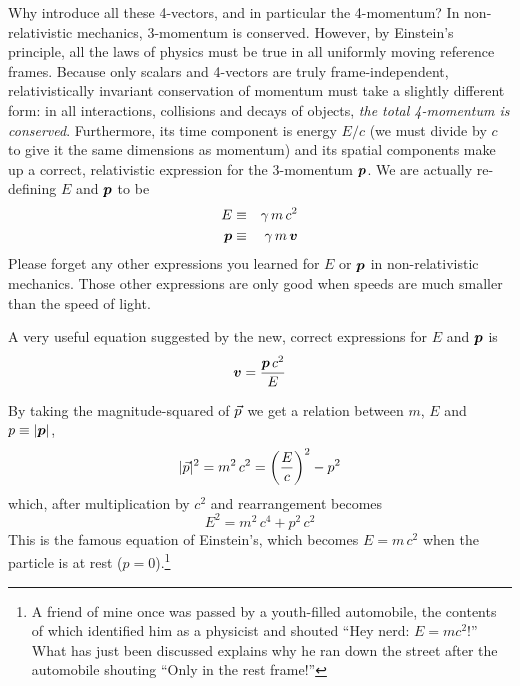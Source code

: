Why introduce all these 4-vectors, and in particular the 4-momentum?
In non-relativistic mechanics, 3-momentum is conserved.  However, by
Einstein's principle, all the laws of physics must be true in all
uniformly moving reference frames.  Because only scalars and 4-vectors
are truly frame-independent, relativistically invariant conservation
of momentum must take a slightly different form: in all interactions,
collisions and decays of objects, {\em the total 4-momentum is
conserved\/}.  Furthermore, its time component is energy $E/c$ (we
must divide by $c$ to give it the same dimensions as momentum) and its
spatial components make up a correct, relativistic expression for the
3-momentum $\mbox{\boldmath $p$}$.  We are actually re-defining $E$ and $\mbox{\boldmath $p$}$ to
be
\begin{eqnarray}
E & \equiv & \gamma\, m\, c^2 \nonumber\\
\mbox{\boldmath $p$} & \equiv & \gamma\, m\, \mbox{\boldmath $v$}
\end{eqnarray}
Please forget any other expressions you learned for $E$ or $\mbox{\boldmath $p$}$ in
non-relativistic mechanics.  Those other expressions are only good
when speeds are much smaller than the speed of light.

A very useful equation suggested by the new, correct expressions for
$E$ and $\mbox{\boldmath $p$}$ is
\begin{equation}
\mbox{\boldmath $v$} = \frac{\mbox{\boldmath $p$}\,c^2}{E}
\end{equation}

By taking the magnitude-squared of $\vec{p}$ we get a relation between
$m$, $E$ and $p\equiv |\mbox{\boldmath $p$}|$,
\begin{equation}
|\vec{p}|^2 = m^2\, c^2 = \left(\frac{E}{c}\right)^2 - p^2
\end{equation}
which, after multiplication by $c^2$ and rearrangement becomes
\begin{equation}
E^2 = m^2\, c^4 + p^2\, c^2
\end{equation}
This is the famous equation of Einstein's, which becomes $E=m\,c^2$
when the particle is at rest ($p=0$).\footnote{A friend of mine once
was passed by a youth-filled automobile, the contents of which
identified him as a physicist and shouted ``Hey nerd: $E=mc^2$!''
What has just been discussed explains why he ran down the street after
the automobile shouting ``Only in the rest frame!''}

